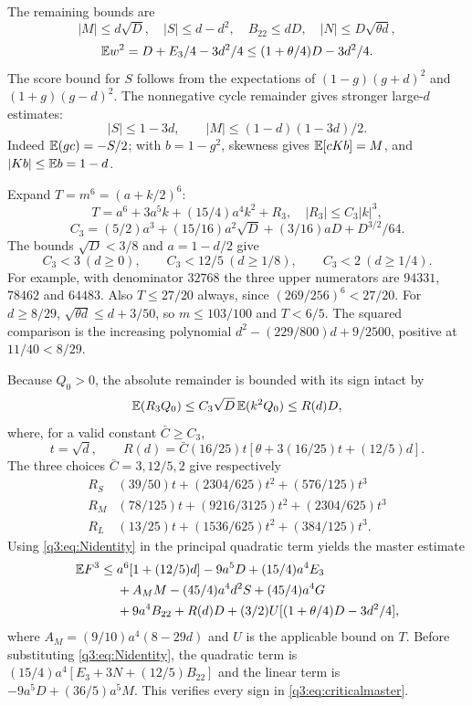The remaining bounds are
\[
 |M|\le d\sqrt D,\quad |S|\le d-d^2,\quad
 B_{22}\le dD,\quad |N|\le D\sqrt{\theta d},
\]
\begin{equation}\label{q3:eq:wsecondcritical}
 \mathbb E w^2=D+E_3/4-3d^2/4
 \le(1+\theta/4)D-3d^2/4.
\end{equation}
The score bound for $S$ follows from the expectations of $(1-g)(g+d)^2$ and $(1+g)(g-d)^2$. The nonnegative cycle remainder gives stronger large-$d$ estimates:
\begin{equation}\label{q3:eq:cyclemoments}
 |S|\le1-3d,\qquad |M|\le(1-d)(1-3d)/2.
\end{equation}
Indeed $\mathbb E(gc)=-S/2$; with $b=1-g^2$, skewness gives $\mathbb E[cKb]=M$, and $|Kb|\le\mathbb E b=1-d$.

Expand $T=m^6=(a+k/2)^6$:
\[
 T=a^6+3a^5k+(15/4)a^4k^2+R_3,\quad
 |R_3|\le C_3|k|^3,
\]
\[
 C_3=(5/2)a^3+(15/16)a^2\sqrt D+
       (3/16)aD+D^{3/2}/64.
\]
The bounds $\sqrt D<3/8$ and $a=1-d/2$ give
\[
 C_3<3\ (d\ge0),\qquad C_3<12/5\ (d\ge1/8),\qquad C_3<2\ (d\ge1/4).
\]
For example, with denominator $32768$ the three upper numerators are $94331$, $78462$ and $64483$.
Also $T\le27/20$ always, since $(269/256)^6<27/20$.
For $d\ge8/29$, $\sqrt{\theta d}\le d+3/50$, so $m\le103/100$ and $T<6/5$. The squared comparison is the increasing polynomial
$d^2-(229/800)d+9/2500$, positive at $11/40<8/29$.

Because $Q_0>0$, the absolute remainder is bounded with its sign intact by
\[
 \mathbb E(R_3Q_0)\le C_3\sqrt D\,\mathbb E(k^2Q_0)\le R(d)D,
\]
where, for a valid constant $\bar C\ge C_3$,
\[
 t=\sqrt d,\qquad
 R(d)=\bar C(16/25)t[\theta+3(16/25)t+(12/5)d].
\]
The three choices $\bar C=3,12/5,2$ give respectively
\[
\begin{array}{c|l}
R_S&(39/50)t+(2304/625)t^2+(576/125)t^3\\
R_M&(78/125)t+(9216/3125)t^2+(2304/625)t^3\\
R_L&(13/25)t+(1536/625)t^2+(384/125)t^3 .
\end{array}
\]
Using \eqref{q3:eq:Nidentity} in the principal quadratic term yields the master estimate
\begin{equation}\label{q3:eq:criticalmaster}
\begin{split}
 \mathbb E F^3\le{}&
 a^6[1+(12/5)d]-9a^5D+(15/4)a^4E_3\\
 &+A_MM-(45/4)a^4d^2S+(45/4)a^4G\\
 &+9a^4B_{22}+R(d)D+(3/2)U[(1+\theta/4)D-3d^2/4],
\end{split}
\end{equation}
where $A_M=(9/10)a^4(8-29d)$ and $U$ is the applicable bound on $T$.
Before substituting \eqref{q3:eq:Nidentity}, the quadratic term is
$(15/4)a^4[E_3+3N+(12/5)B_{22}]$ and the linear term is
$-9a^5D+(36/5)a^5M$. This verifies every sign in \eqref{q3:eq:criticalmaster}.


